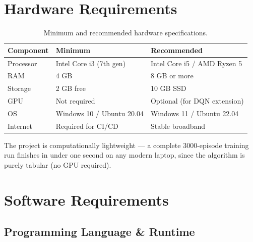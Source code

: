 \documentclass[12pt,a4paper]{report}
\begin{document}
\section{Hardware Requirements}

\begin{table}[H]
  \centering
  \caption{Minimum and recommended hardware specifications.}
  \label{tab:hardware}
  \begin{tabular}{lll}
    \toprule
    \textbf{Component} & \textbf{Minimum} & \textbf{Recommended} \\
    \midrule
    Processor  & Intel Core i3 (7th gen) & Intel Core i5 / AMD Ryzen 5 \\
    RAM        & 4 GB                    & 8 GB or more              \\
    Storage    & 2 GB free               & 10 GB SSD                 \\
    GPU        & Not required            & Optional (for DQN extension) \\
    OS         & Windows 10 / Ubuntu 20.04 & Windows 11 / Ubuntu 22.04 \\
    Internet   & Required for CI/CD     & Stable broadband           \\
    \bottomrule
  \end{tabular}
\end{table}

The project is computationally lightweight --- a complete 3000-episode
training run finishes in under one second on any modern laptop, since the
algorithm is purely tabular (no GPU required).

\section{Software Requirements}

\subsection{Programming Language \& Runtime}
\end{document}

